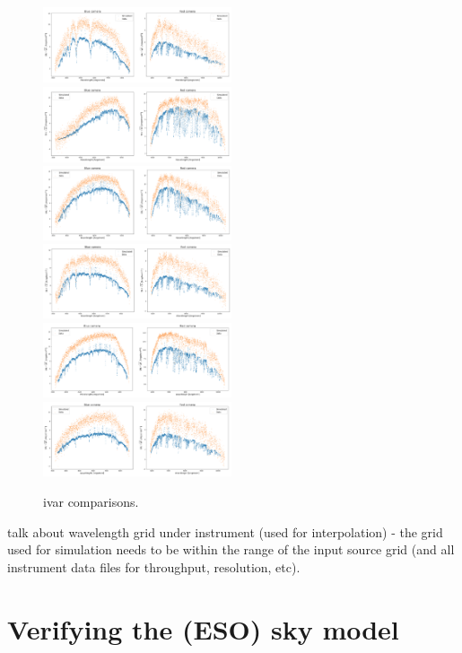 \begin{figure}[h]
    \centering
    \includegraphics[width=0.495\textwidth]{images/specsim/ivar_4055_55359_334.png}
    \includegraphics[width=0.495\textwidth]{images/specsim/ivar_4055_55359_395.png}
    \includegraphics[width=0.495\textwidth]{images/specsim/ivar_4055_55359_41.png}
     \includegraphics[width=0.495\textwidth]{images/specsim/ivar_4055_55359_694.png}
      \includegraphics[width=0.495\textwidth]{images/specsim/ivar_4055_55359_890.png}
       \includegraphics[width=0.495\textwidth]{images/specsim/ivar_4055_55359_970.png}
    \caption{ivar comparisons.}
    \label{fig:ivar}
\end{figure}

talk about wavelength grid under instrument (used for interpolation) - the grid used for simulation needs to be within the range of the input source grid (and all instrument data files for throughput, resolution, etc).  


\section{Verifying the (ESO) sky model}


